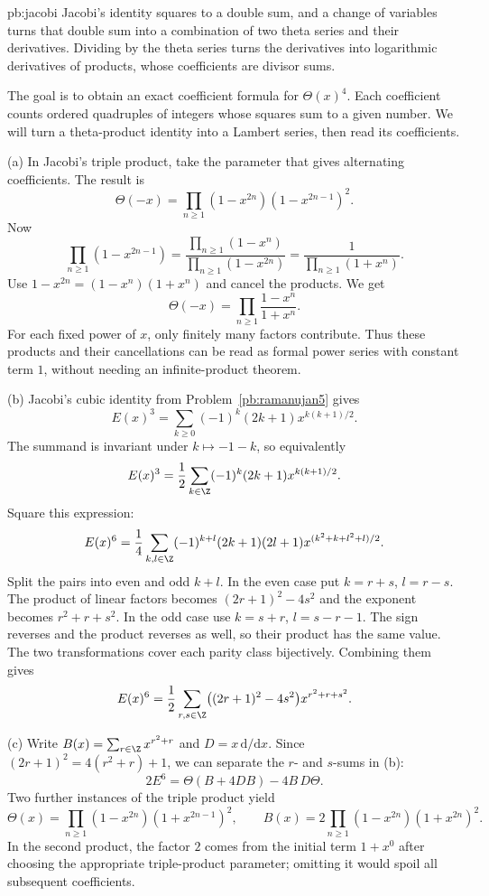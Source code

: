 \begin{solution}{pb:jacobi}
\idea Jacobi's identity squares to a double sum, and a change of variables turns that double sum into a combination of two theta series and their derivatives. Dividing
by the theta series turns the derivatives into logarithmic derivatives of products, whose coefficients are divisor sums.

\writeup The goal is to obtain an exact coefficient formula for $\Theta(x)^4$. Each coefficient counts ordered quadruples of integers whose squares sum to a given number. We will turn a theta-product identity into a Lambert series, then read its coefficients.

(a) In Jacobi's triple product, take the parameter that gives alternating coefficients. The result is
\[
\Theta(-x)=\prod_{n\ge1}(1-x^{2n})(1-x^{2n-1})^2.
\]
Now
\[
\prod_{n\ge1}(1-x^{2n-1})
=\frac{\prod_{n\ge1}(1-x^n)}
       {\prod_{n\ge1}(1-x^{2n})}
=\frac1{\prod_{n\ge1}(1+x^n)}.
\]
Use $1-x^{2n}=(1-x^n)(1+x^n)$ and cancel the products. We get
\[
\Theta(-x)=\prod_{n\ge1}\frac{1-x^n}{1+x^n}.
\]
For each fixed power of $x$, only finitely many factors contribute.
Thus these products and their cancellations can be read as formal
power series with constant term $1$, without needing an infinite-product theorem.

(b) Jacobi's cubic identity from Problem~\ref{pb:ramanujan5} gives
\[
E(x)^3=\sum_{k\ge0}(-1)^k(2k+1)x^{k(k+1)/2}.
\]
The summand is invariant under $k\mapsto-1-k$, so equivalently
\[
E(x)^3=\frac12\sum_{k\in\Z}(-1)^k(2k+1)x^{k(k+1)/2}.
\]
Square this expression:
\[
E(x)^6=\frac14\sum_{k,l\in\Z}
(-1)^{k+l}(2k+1)(2l+1)
x^{(k^2+k+l^2+l)/2}.
\]
Split the pairs into even and odd $k+l$. In the even case put $k=r+s$, $l=r-s$. The product of linear factors becomes $(2r+1)^2-4s^2$ and the exponent becomes $r^2+r+s^2$. In the odd case use $k=s+r$, $l=s-r-1$. The sign reverses and the product reverses as well, so their product has the same value. The two transformations cover each parity class bijectively. Combining them gives
\[
E(x)^6=\frac12\sum_{r,s\in\Z}
\bigl((2r+1)^2-4s^2\bigr)x^{r^2+r+s^2}.
\]

(c) Write
$B(x)=\sum_{r\in\Z}x^{r^2+r}$ and $D=x\,\mathrm d/\mathrm dx$. Since $(2r+1)^2=4(r^2+r)+1$, we can separate the $r$- and $s$-sums in (b):
\[
2E^6=\Theta(B+4DB)-4B\,D\Theta.
\]
Two further instances of the triple product yield
\[
\Theta(x)=\prod_{n\ge1}(1-x^{2n})(1+x^{2n-1})^2,\qquad
B(x)=2\prod_{n\ge1}(1-x^{2n})(1+x^{2n})^2.
\]
In the second product, the factor $2$ comes from the initial term $1+x^0$ after choosing the appropriate triple-product parameter; omitting it would spoil all subsequent coefficients.


\end{solution}
